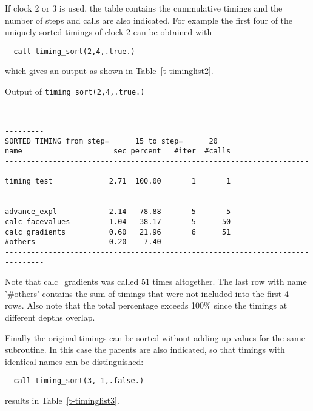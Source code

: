 \documentclass[10pt]{article}
\begin{document}
If clock 2 or 3 is used, the table contains the cummulative timings 
and the number of steps and calls are also indicated. 
For example the first four of the uniquely sorted timings of clock 2 
can be obtained with
\begin{verbatim}
  call timing_sort(2,4,.true.)
\end{verbatim}
which gives an output as shown in Table~\ref{t-timinglist2}.
\begin{table}
\caption{Output of {\tt timing\_sort(2,4,.true.)}}

{\footnotesize
\begin{verbatim}

-------------------------------------------------------------------------------
SORTED TIMING from step=      15 to step=      20
name                     sec percent   #iter  #calls
-------------------------------------------------------------------------------
timing_test             2.71  100.00       1       1
-------------------------------------------------------------------------------
advance_expl            2.14   78.88       5       5
calc_facevalues         1.04   38.17       5      50
calc_gradients          0.60   21.96       6      51
#others                 0.20    7.40
-------------------------------------------------------------------------------

\end{verbatim}
}
\label{t-timinglist2}
\end{table}
Note that calc\_gradients was called 51 times altogether. The last row
with name '\#others' contains the sum of timings that were not included
into the first 4 rows. Also note that the total percentage exceeds 
100\% since the timings at different depths overlap.

Finally the original timings can be sorted without adding up values
for the same subroutine. In this case the parents are also indicated,
so that timings with identical names can be distinguished:
\begin{verbatim}
  call timing_sort(3,-1,.false.)
\end{verbatim}
results in Table~\ref{t-timinglist3}.
\end{document}
